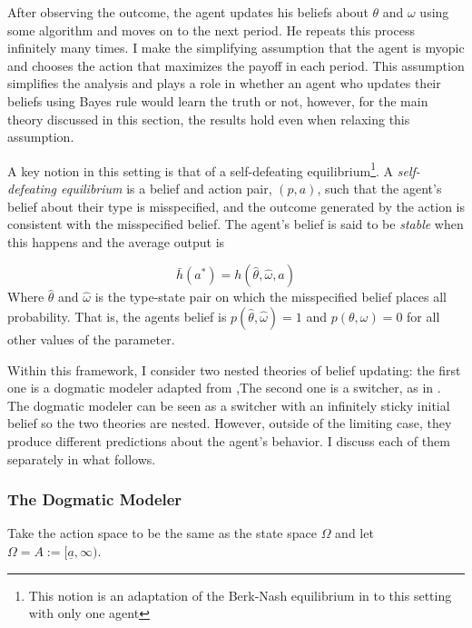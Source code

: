 \documentclass[
  12pt,
]{article}
\begin{document}
After observing the outcome, the agent updates his beliefs about
\(\theta\) and \(\omega\) using some algorithm and moves on to the next
period. He repeats this process infinitely many times. I make the
simplifying assumption that the agent is myopic and chooses the action
that maximizes the payoff in each period. This assumption simplifies the
analysis and plays a role in whether an agent who updates their beliefs
using Bayes rule would learn the truth or not, however, for the main
theory discussed in this section, the results hold even when relaxing
this assumption.

A key notion in this setting is that of a self-defeating
equilibrium\footnote{This notion is an adaptation of the Berk-Nash equilibrium in \citet{Esponda2016} to this setting with only one agent}.
A \emph{self-defeating equilibrium} is a belief and action pair,
\((p, a)\), such that the agent's belief about their type is
misspecified, and the outcome generated by the action is consistent with
the misspecified belief. The agent's belief is said to be \emph{stable}
when this happens and the average output is

\[\bar{h}(a^*) = h(\hat{\theta}, \hat{\omega}, a)\] Where
\(\hat{\theta}\) and \(\hat{\omega}\) is the type-state pair on which
the misspecified belief places all probability. That is, the agents
belief is \(p(\hat{\theta}, \hat{\omega}) = 1\) and
\(p(\theta, \omega) = 0\) for all other values of the parameter.

Within this framework, I consider two nested theories of belief
updating: the first one is a dogmatic modeler adapted from
\citet{Heidhues2018},The second one is a switcher, as in \citet{Ba2023}.
The dogmatic modeler can be seen as a switcher with an infinitely sticky
initial belief so the two theories are nested. However, outside of the
limiting case, they produce different predictions about the agent's
behavior. I discuss each of them separately in what follows.

\hypertarget{the-dogmatic-modeler}{%
\subsubsection{The Dogmatic Modeler}\label{the-dogmatic-modeler}}

Take the action space to be the same as the state space \(\Omega\) and
let \(\Omega=A:=[\underline{a}, \infty)\).
\end{document}
